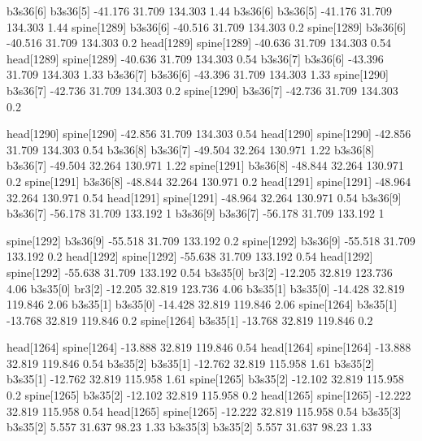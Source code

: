 b3s36[6]    b3s36[5]    -41.176    31.709    134.303    1.44
b3s36[6]    b3s36[5]    -41.176    31.709    134.303    1.44
spine[1289]    b3s36[6]    -40.516    31.709    134.303    0.2
spine[1289]    b3s36[6]    -40.516    31.709    134.303    0.2
head[1289]    spine[1289]    -40.636    31.709    134.303    0.54
head[1289]    spine[1289]    -40.636    31.709    134.303    0.54
b3s36[7]    b3s36[6]    -43.396    31.709    134.303    1.33
b3s36[7]    b3s36[6]    -43.396    31.709    134.303    1.33
spine[1290]    b3s36[7]    -42.736    31.709    134.303    0.2
spine[1290]    b3s36[7]    -42.736    31.709    134.303    0.2


head[1290]    spine[1290]    -42.856    31.709    134.303    0.54
head[1290]    spine[1290]    -42.856    31.709    134.303    0.54
b3s36[8]    b3s36[7]    -49.504    32.264    130.971    1.22
b3s36[8]    b3s36[7]    -49.504    32.264    130.971    1.22
spine[1291]    b3s36[8]    -48.844    32.264    130.971    0.2
spine[1291]    b3s36[8]    -48.844    32.264    130.971    0.2
head[1291]    spine[1291]    -48.964    32.264    130.971    0.54
head[1291]    spine[1291]    -48.964    32.264    130.971    0.54
b3s36[9]    b3s36[7]    -56.178    31.709    133.192    1
b3s36[9]    b3s36[7]    -56.178    31.709    133.192    1


spine[1292]    b3s36[9]    -55.518    31.709    133.192    0.2
spine[1292]    b3s36[9]    -55.518    31.709    133.192    0.2
head[1292]    spine[1292]    -55.638    31.709    133.192    0.54
head[1292]    spine[1292]    -55.638    31.709    133.192    0.54
b3s35[0]    br3[2]    -12.205    32.819    123.736    4.06
b3s35[0]    br3[2]    -12.205    32.819    123.736    4.06
b3s35[1]    b3s35[0]    -14.428    32.819    119.846    2.06
b3s35[1]    b3s35[0]    -14.428    32.819    119.846    2.06
spine[1264]    b3s35[1]    -13.768    32.819    119.846    0.2
spine[1264]    b3s35[1]    -13.768    32.819    119.846    0.2


head[1264]    spine[1264]    -13.888    32.819    119.846    0.54
head[1264]    spine[1264]    -13.888    32.819    119.846    0.54
b3s35[2]    b3s35[1]    -12.762    32.819    115.958    1.61
b3s35[2]    b3s35[1]    -12.762    32.819    115.958    1.61
spine[1265]    b3s35[2]    -12.102    32.819    115.958    0.2
spine[1265]    b3s35[2]    -12.102    32.819    115.958    0.2
head[1265]    spine[1265]    -12.222    32.819    115.958    0.54
head[1265]    spine[1265]    -12.222    32.819    115.958    0.54
b3s35[3]    b3s35[2]    5.557    31.637    98.23    1.33
b3s35[3]    b3s35[2]    5.557    31.637    98.23    1.33


